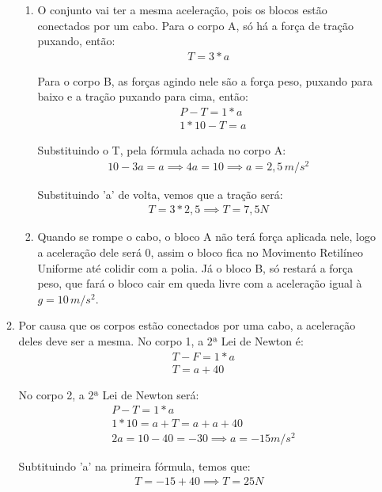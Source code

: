 \documentclass[12pt,letterpaper,fleqn]{article}
\begin{document}
\begin{itemize}
\begin{enumerate}
\begin{enumerate}
        \item O conjunto vai ter a mesma aceleração, pois os blocos estão conectados por um cabo. Para o corpo A, só há a força de tração puxando, então:
        \begin{align*}
            T = 3*a
        \end{align*}
        
        Para o corpo B, as forças agindo nele são a força peso, puxando para baixo e a tração puxando para cima, então:
        \begin{align*}
            &P - T = 1*a \\
            &1*10 - T = a
        \end{align*}
        
        Substituindo o T, pela fórmula achada no corpo A:
        \begin{align*}
            10 - 3a = a \implies 4a = 10 \implies a =2,5\,m/s^2
        \end{align*}
        
        Substituindo 'a' de volta, vemos que a tração será:
        \begin{align*}
            T =3*2,5 \implies T = 7,5 N
        \end{align*}
        
        \item Quando se rompe o cabo, o bloco A não terá força aplicada nele, logo a aceleração dele será 0, assim o bloco fica no Movimento Retilíneo Uniforme até colidir com a polia. Já o bloco B, só restará a força peso, que fará o bloco cair em queda livre com a aceleração igual à $g=10\,m/s^2$.
    \end{enumerate}
    
    \item Por causa que os corpos estão conectados por uma cabo, a aceleração deles deve ser a mesma. No corpo 1, a 2ª Lei de Newton é:
    \begin{align*}
        &T - F =1*a\\
        &T = a +40
    \end{align*}
    
    No corpo 2, a 2ª Lei de Newton será:
    \begin{align*}
        &P - T = 1*a\\
        &1*10 = a + T = a + a+ 40 \\
        &2a=10 - 40 = -30\implies a = -15m/s^2
    \end{align*}
    
    Subtituindo 'a' na primeira fórmula, temos que:
    \begin{align*}
        T = -15 + 40 \implies \boxed{T = 25 N}
    \end{align*}
    

\end{enumerate}
\end{itemize}
\end{document}
